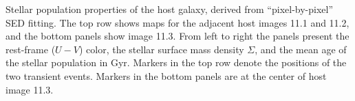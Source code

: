 \label{fig:HostProperties}
Stellar population properties of the \spock host galaxy, derived from
``pixel-by-pixel'' SED fitting.  The top row shows maps for the adjacent
host images 11.1 and 11.2, and the bottom panels show image 11.3.
From left to right the panels present the rest-frame ($U-V$) color, the
stellar surface mass density $\Sigma$, and the mean age of the
stellar population in Gyr.  Markers in the top row denote the
positions of the two \spock transient events. Markers in the bottom
panels are at the center of host image 11.3.
